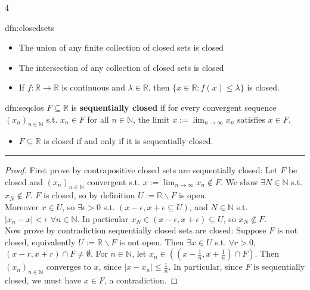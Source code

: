 \documentclass[landscape, 8pt]{extarticle}
\begin{document}
\begin{multicols*}{4}
\begin{dfn}{dfn:closedsets}{ }
			\begin{itemize}
				\item The union of any finite collection of closed sets is closed
				\item The intersection of any collection of closed sets is closed
				\item If $f: \mathbb{R} \to \mathbb{R}$ is continuous and $ \lambda \in \mathbb{R}$, then $\{x \in \mathbb{R} : f(x) \le \lambda\}$ is closed.
			\end{itemize}
			
		\end{dfn}
		
		
		\begin{dfn}{dfn:seqclos}{ }
			$F \subseteq \mathbb{R}$ is \textbf{sequentially closed} if for every convergent sequence $(x_n)_{n \in \mathbb{N}}$ s.t. $x_n \in F$ for all $n \in \mathbb{N}$, the limit $x := \lim_{n\to \infty}x_n$ satisfies $x \in F$.
			\begin{itemize}
				\item $F \subseteq \mathbb{R}$ is closed if and only if it is sequentially closed.
			\end{itemize}
			\vspace{1pt}
			\hrule	
			\vspace{-6pt}
			\begin{proof}
				First prove by contrapositive closed sets are sequentially closed: Let $F$ be closed and $(x_n)_{n\in \mathbb{N}}$ convergent s.t. $x:= \lim_{n\to \infty}x_n \notin F$. We show $\exists N\in \mathbb{N}$ s.t. $x_N \notin F$. $F$ is closed, so by definition $U := \mathbb{R} \backslash F$ is open. \\
				Moreover $x\in U$, so $\exists\epsilon > 0 $ s.t. $(x-\epsilon, x+\epsilon \subseteq U)$, and $N\in \mathbb{N}$ s.t. \\
				$\left|x_n - x\right| <\epsilon$ $\forall n\in \mathbb{N}$. In particular $x_N\in (x-\epsilon, x +\epsilon) \subseteq U$, so $x_N \notin F$.\\
				Now prove by contradiction sequentially closed sets are closed: Suppose $F$ is not closed, equivalently $U := \mathbb{R} \backslash F$ is not open. Then $\exists x\in U$ s.t. $\forall r > 0$, $(x-r, x+r) \cap F \ne \emptyset$. For $n\in \mathbb{N}$, let $x_n \in ((x - \frac{1}{n}, x+ \frac{1}{n}) \cap F)$. Then $(x_n)_{n\in \mathbb{N}}$ converges to $x$, since $\left|x - x_n\right| \le \frac{1}{n}$. In particular, since $F$ is sequentially closed, we must have $x\in F$, a contradiction.
			\end{proof}
			

\end{dfn}
\end{multicols*}
\end{document}

